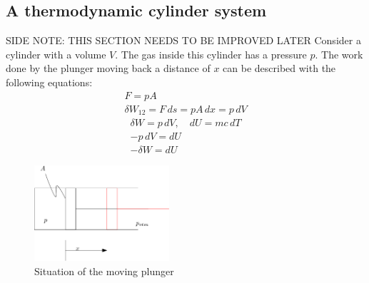 \documentclass[11pt, a4paper]{article}
\begin{document}
\subsection{A thermodynamic cylinder system}
SIDE NOTE: THIS SECTION NEEDS TO BE IMPROVED LATER
Consider a cylinder with a volume $V$. The gas inside this cylinder has a pressure $p$. The work done by the plunger moving back a distance of $x$ can be described with the following equations:
\begin{gather}
  F = pA\\
  \delta W_{12} = F\,ds = pA\,dx = p\,dV
\end{gather}
\begin{gather}
  \delta W = p\,dV, \quad dU = mc\,dT\\
  -p\,dV = dU\\
  -\delta W = dU
\end{gather}
\begin{figure}[h!]
  \centerline{\includegraphics[width=50mm]{images/Work Done.png}}
  \caption{Situation of the moving plunger}
\end{figure}
\end{document}
